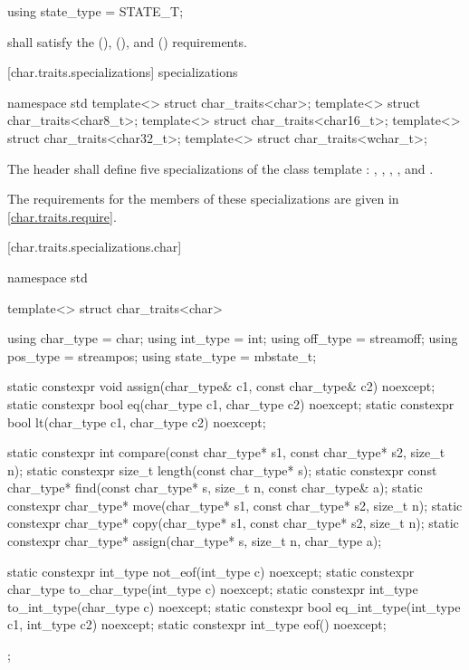 %
\begin{itemdecl}
using state_type = STATE_T;
\end{itemdecl}

\begin{itemdescr}
\pnum
\requires
{}
shall satisfy the
 (),
 (), and
 () requirements.
\end{itemdescr}

[char.traits.specializations]{ specializations}

%
\begin{codeblock}
namespace std {
  template<> struct char_traits<char>;
  template<> struct char_traits<char8_t>;
  template<> struct char_traits<char16_t>;
  template<> struct char_traits<char32_t>;
  template<> struct char_traits<wchar_t>;
}
\end{codeblock}

\pnum
The header
shall define five
specializations of the class template
:
,
,
,
,
and
.

\pnum
The requirements for the members of these specializations are given in
\ref{char.traits.require}.

[char.traits.specializations.char]{}

%
\begin{codeblock}
namespace std {
  template<> struct char_traits<char> {
    using char_type  = char;
    using int_type   = int;
    using off_type   = streamoff;
    using pos_type   = streampos;
    using state_type = mbstate_t;

    static constexpr void assign(char_type& c1, const char_type& c2) noexcept;
    static constexpr bool eq(char_type c1, char_type c2) noexcept;
    static constexpr bool lt(char_type c1, char_type c2) noexcept;

    static constexpr int compare(const char_type* s1, const char_type* s2, size_t n);
    static constexpr size_t length(const char_type* s);
    static constexpr const char_type* find(const char_type* s, size_t n,
                                           const char_type& a);
    static constexpr char_type* move(char_type* s1, const char_type* s2, size_t n);
    static constexpr char_type* copy(char_type* s1, const char_type* s2, size_t n);
    static constexpr char_type* assign(char_type* s, size_t n, char_type a);

    static constexpr int_type not_eof(int_type c) noexcept;
    static constexpr char_type to_char_type(int_type c) noexcept;
    static constexpr int_type to_int_type(char_type c) noexcept;
    static constexpr bool eq_int_type(int_type c1, int_type c2) noexcept;
    static constexpr int_type eof() noexcept;
  };
}
\end{codeblock}


